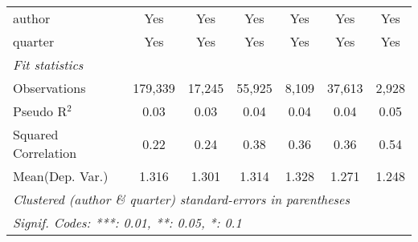 \begin{tabular}{lcccccc}
   author                                                     & Yes            & Yes           & Yes           & Yes          & Yes          & Yes\\  
   quarter                                                    & Yes            & Yes           & Yes           & Yes          & Yes          & Yes\\  
   \midrule
   \emph{Fit statistics}\\
   Observations                                               & 179,339        & 17,245        & 55,925        & 8,109        & 37,613       & 2,928\\  
   Pseudo R$^2$                                               & 0.03           & 0.03          & 0.04          & 0.04         & 0.04         & 0.05\\  
   Squared Correlation                                        & 0.22           & 0.24          & 0.38          & 0.36         & 0.36         & 0.54\\  
Mean(Dep. Var.) & 1.316 & 1.301 & 1.314 & 1.328 & 1.271 & 1.248 \\
   \midrule \midrule
   \multicolumn{7}{l}{\emph{Clustered (author \& quarter) standard-errors in parentheses}}\\
   \multicolumn{7}{l}{\emph{Signif. Codes: ***: 0.01, **: 0.05, *: 0.1}}\\
\end{tabular}
\par\endgroup
